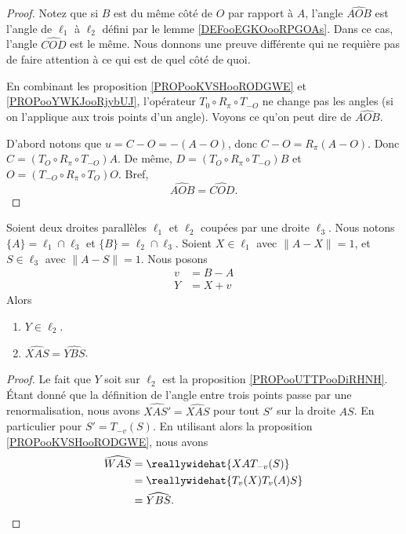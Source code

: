 \begin{proof}
	Notez que si \( B\) est du même côté de \( O\) par rapport à \( A\), l'angle \( \widehat{AOB}\) est l'angle de \( \ell_1\) à \( \ell_2\) défini par le lemme \ref{DEFooEGKOooRPGOAs}. Dans ce cas, l'angle \( \widehat{COD}\) est le même. Nous donnons une preuve différente qui ne requière pas de faire attention à ce qui est de quel côté de quoi.

	En combinant les proposition \ref{PROPooKVSHooRODGWE} et \ref{PROPooYWKJooRjybUJ}, l'opérateur \( T_0\circ R_{\pi}\circ T_{-O}\) ne change pas les angles (si on l'applique aux trois points d'un angle). Voyons ce qu'on peut dire de \( \widehat{AOB}\).

	D'abord notons que \( u=C-O=-(A-O)\), donc \( C-O=R_{\pi}(A-O)\). Donc \( C=(T_O\circ R_{\pi}\circ T_{-O})A\). De même, \( D=(T_O\circ R_{\pi}\circ T_{-O})B\) et \( O=(T_{-O}\circ R_{\pi}\circ T_O)O\). Bref,
	\begin{equation}
		\widehat{AOB}=\widehat{COD}.
	\end{equation}
\end{proof}

\begin{proposition}	\label{PROPooCUWIooQPxiXM}
	Soient deux droites parallèles \( \ell_1\) et \( \ell_2\) coupées par une droite \( \ell_3\). Nous notons  \( \{ A \}=\ell_1\cap \ell_3\) et \( \{ B \}=\ell_2\cap\ell_3\). Soient \( X\in\ell_1\) avec \( \| A-X \|=1\), et \( S\in\ell_3\) avec \( \| A-S \|=1\). Nous posons
	\begin{subequations}
		\begin{align}
			v & =B-A \\
			Y & =X+v
		\end{align}
	\end{subequations}
	Alors
	\begin{enumerate}
		\item
		      \( Y\in \ell_2\).
		\item
		      \( \widehat{XAS}=\widehat{YBS}\).
	\end{enumerate}
\end{proposition}

\begin{proof}
	Le fait que \( Y\) soit sur \( \ell_2\) est la proposition \ref{PROPooUTTPooDiRHNH}. Étant donné que la définition de l'angle entre trois points passe par une renormalisation, nous avons \( \widehat{XAS'}=\widehat{XAS}\) pour tout \( S'\) sur la droite \( AS\). En particulier pour \( S'=T_{-v}(S)\). En utilisant alors la proposition \ref{PROPooKVSHooRODGWE}, nous avons
	\begin{subequations}
		\begin{align}
			\widehat{WAS} & =\reallywidehat{XAT_{-v}(S)}   \\
			              & =\reallywidehat{T_v(X)T_v(A)S} \\
			              & =\widehat{YBS}.
		\end{align}
	\end{subequations}
\end{proof}



